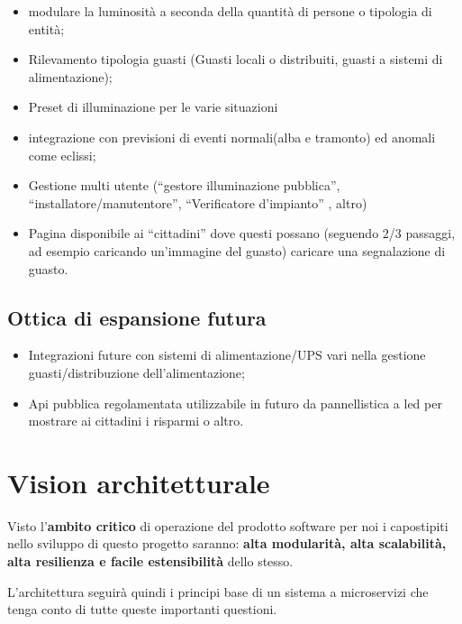 \begin{itemize}
\item
  modulare la luminosità a seconda della quantità di persone o tipologia
  di entità;
\item
  Rilevamento tipologia guasti (Guasti locali o distribuiti, guasti a
  sistemi di alimentazione);
\item
  Preset di illuminazione per le varie situazioni
\item
  integrazione con previsioni di eventi normali(alba e tramonto) ed
  anomali come eclissi;
\item
  Gestione multi utente (``gestore illuminazione pubblica'',
  ``installatore/manutentore'', ``Verificatore d'impianto'' , altro)
\item
  Pagina disponibile ai ``cittadini'' dove questi possano (seguendo 2/3
  passaggi, ad esempio caricando un'immagine del guasto) caricare una
  segnalazione di guasto.
\end{itemize}

\hypertarget{ottica-di-espansione-futura}{%
\subsection{Ottica di espansione
futura}\label{ottica-di-espansione-futura}}

\begin{itemize}
\item
  Integrazioni future con sistemi di alimentazione/UPS vari nella
  gestione guasti/distribuzione dell'alimentazione;
\item
  Api pubblica regolamentata utilizzabile in futuro da pannellistica a
  led per mostrare ai cittadini i risparmi o altro.
\end{itemize}

\hypertarget{vision-architetturale}{%
\section{Vision architetturale}\label{vision-architetturale}}

Visto l'\textbf{ambito critico} di operazione del prodotto software per
noi i capostipiti nello sviluppo di questo progetto saranno:
\textbf{alta modularità, alta scalabilità, alta resilienza e facile
estensibilità} dello stesso.

L'architettura seguirà quindi i principi base di un sistema a
microservizi che tenga conto di tutte queste importanti questioni.

